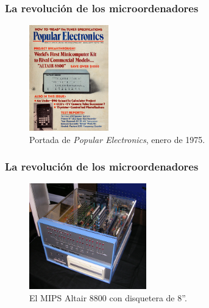\documentclass{beamer}
\begin{document}
\begin{frame}
\frametitle{La revolución de los microordenadores}

\begin{figure}[h]

\begin{center}
  \includegraphics[height=1.80in]{figs/Popular_Electronics_Cover_Jan_1975.jpg}
  \caption{{\footnotesize Portada de \textit{Popular Electronics}, enero de 1975.}}
\end{center}
\end{figure}


\end{frame}


\begin{frame}
\frametitle{La revolución de los microordenadores}


\begin{figure}[h]

\begin{center}
  \includegraphics[height=1.80in]{figs/Altair_8800_Computer.jpg}
  \caption{{\footnotesize El MIPS Altair 8800 con disquetera de 8''.}}
\end{center}
\end{figure}


\end{frame}




\end{document}
